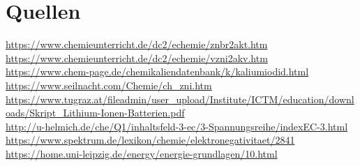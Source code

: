 \documentclass[11pt]{article}
\begin{document}
\section{Quellen}
\url{https://www.chemieunterricht.de/dc2/echemie/znbr2akt.htm}\\
\url{https://www.chemieunterricht.de/dc2/echemie/vzni2akv.htm}\\
\url{https://www.chem-page.de/chemikaliendatenbank/k/kaliumiodid.html}\\
\url{https://www.seilnacht.com/Chemie/ch_zni.htm}\\
\url{https://www.tugraz.at/fileadmin/user_upload/Institute/ICTM/education/downloads/Skript_Lithium-Ionen-Batterien.pdf}\\
\url{http://u-helmich.de/che/Q1/inhaltsfeld-3-ec/3-Spannungsreihe/indexEC-3.html}\\
\url{https://www.spektrum.de/lexikon/chemie/elektronegativitaet/2841}\\
\url{https://home.uni-leipzig.de/energy/energie-grundlagen/10.html }
\end{document}
